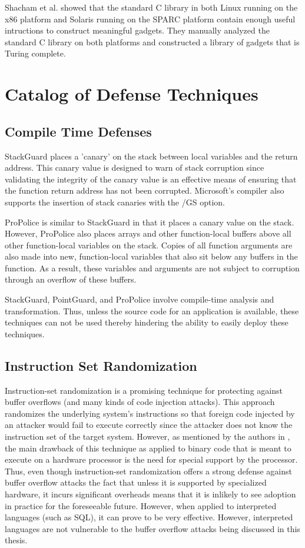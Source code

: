 Shacham et al. showed that the standard C library in both Linux running on the x86 platform and
Solaris running on the SPARC platform contain enough useful intructions to construct meaningful
gadgets. They manually analyzed the standard C library on both platforms and constructed a library
of gadgets that is Turing complete.

\section{Catalog of Defense Techniques}

\subsection{Compile Time Defenses}

StackGuard \cite{stackguard-98} places a 'canary' on the stack between local variables and the
return address. This canary value is designed to warn of stack corruption since validating the
integrity of the canary value is an effective means of ensuring that the function return address has
not been corrupted. Microsoft's compiler also supports the insertion of stack canaries with the /GS
option.

ProPolice \cite{} is similar to StackGuard in that it places a canary value on the stack. However,
ProPolice also places arrays and other function-local buffers above all other function-local
variables on the stack. Copies of all function arguments are also made into new, function-local
variables that also sit below any buffers in the function. As a result, these variables and
arguments are not subject to corruption through an overflow of these buffers. 

StackGuard, PointGuard, and ProPolice involve compile-time analysis and transformation. Thus, unless
the source code for an application is available, these techniques can not be used thereby hindering
the ability to easily deploy these techniques.

\subsection{Instruction Set Randomization}

Instruction-set randomization \cite{} is a promising technique for protecting against buffer
overflows (and many kinds of code injection attacks). This approach randomizes the underlying
system's instructions so that foreign code injected by an attacker would fail to execute correctly
since the attacker does not know the instruction set of the target system. However, as mentioned by
the authors in \cite{}, the main drawback of this technique as applied to binary code that is meant
to execute on a hardware processor is the need for special support by the processor. Thus, even
though instruction-set randomization offers a strong defense against buffer overflow attacks the
fact that unless it is supported by specialized hardware, it incurs significant overheads means that
it is inlikely to see adoption in practice for the foreseeable future. However, when applied to
interpreted languages (such as SQL), it can prove to be very effective. However, interpreted
languages are not vulnerable to the buffer overflow attacks being discussed in this thesis.
